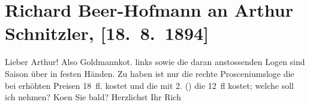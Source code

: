 

         
         \renewcommand{\erwaehntePersonen}{Personen: Paul Goldmann}
         \renewcommand{\erwaehnteOrte}{Orte: Wien}
         \renewcommand{\erwaehnteWerke}{}
               \section[Richard Beer-Hofmann an Arthur Schnitzler, {[}18. 8. 1894{]}]{ Richard Beer-Hofmann an Arthur Schnitzler, {[}18. 8. 1894{]}}\nopagebreak{}\rehead{ }\begin{ledgroupsized}[t]{13cm}\normalsize\beginnumbering \toendnotes[C]{\smallbreak\pagebreak[2]} 
\toendnotes[C]{\smallbreak}\pstart
           \noindent{}{\pb}Lieber Arthur! Also
                  Goldmannko{\geminationm}t. \label{K_L00362-1v}\label{K_L00362-1h} links sowie die daran anstossenden Logen sind
               Saison über in festen Händen. Zu haben ist {\pb}nur die rechte Prosceniumsloge die
               bei erhöhten Preisen 18 fl. kostet und die  mit
               2. (\label{T_L00362-1v}\label{T_L00362-1h}) \label{K_L00362-2v}\label{K_L00362-2h} die 12 fl kostet; welche soll ich nehmen? Ko{\geminationm}en Sie bald?\pend
           \pstart Herzlichst Ihr \spacefill\mbox{Rich}\pend{}
         
         \endnumbering{}\end{ledgroupsized}  \newcommand{\dateiname}{L00362}\newcommand{\titel}{Richard Beer-Hofmann an Arthur Schnitzler, [18. 8. 1894]}\newcommand{\editorInnen}{Martin Anton Müller und Gerd-Hermann Susen}
      
